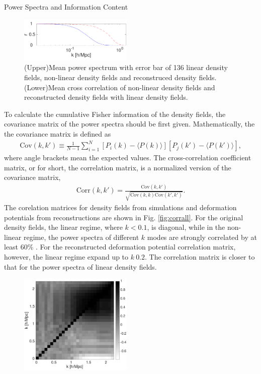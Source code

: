 \begin{section}{Power Spectra and Information Content}
\begin{figure}[t!]
\begin{center}
\end{center}
\begin{flushright}
\includegraphics[width=0.48\textwidth,height=0.1\textwidth]{correlation_good-crop.pdf}
\end{flushright}
\caption{(Upper)Mean power spectrum with error bar of 136 linear density fields, non-linear 
density fields and reconstruced density fields.(Lower)Mean cross correlation of non-linear 
density fields and reconstructed density fields with linear density fields.}
\end{figure}
    To calculate the cumulative Fisher information of the density fields, the covariance matrix 
of the power spectra should be first given. Mathematically, the the covariance matrix is defined as
\begin{align}
    \mathrm{Cov}\left(k,k'\right)\equiv \frac{1}{N-1}\sum_{i=1}^{N}\left[ P_i \left( k \right) - 
\langle P \left( k \right) \rangle \right]\left[ P_j \left( k' \right) - \langle P \left( k' \right)\rangle \right],
\end{align}
where angle brackets mean the expected values. 
    The cross-correlation coefficient matrix, or for short, the correlation matrix, is a 
normalized version of the covariance matrix,
\begin{align}
    \mathrm{Corr}\left(k,k'\right)=\frac{\mathrm{Cov}\left(k,k'\right)}{\sqrt{\mathrm{Cov}\left(k,k\right)\mathrm{Cov}\left(k',k'\right)}}.
\end{align}
The corelation matrices for density fields from simulations and deformation potentials from 
reconstructions are shown in Fig. \ref{fig:corrall}. For the original density fields, the 
linear regime, where $k<0.1$, is diagonal, while in the non-linear regime, the power spectra of 
different $k$ modes are strongly correlated by at least $60\%$ . For the reconstructed deformation 
potential correlation matrix, however, the linear regime expand up to $k~0.2$. The correlation 
matrix is closer to that for the power spectra of linear density fields.
\begin{figure}
 \centering
  \includegraphics[width=0.48\textwidth]{corrmatrix_good-crop.pdf}

\end{figure}
\end{section}
